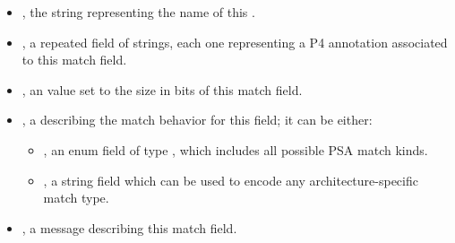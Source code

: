 \documentclass[11pt]{article}
\begin{document}
{\begin{itemize}
\begin{itemize}
\item{}
, the string representing the name of this .%

\item{}
, a repeated field of strings, each one representing a P4
annotation associated to this match field.%

\item{}
, an  value set to the size in bits of this match field.%

\item{}
, a  describing the match behavior for this field; it can be
either:%

\begin{itemize}[noitemsep,topsep=\mdcompacttopsep]%

\item{}, an enum field of type , which includes all
possible PSA match kinds.%

\item{}, a string field which can be used to encode any
architecture-specific match type.%
\end{itemize}%

\item{}
, a  message describing this match field.%


\end{itemize}
\end{itemize}}
\end{document}
